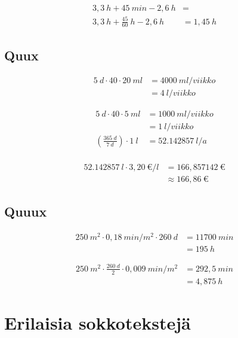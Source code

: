 \begin{align*}
3,3\ h + 45\ min - 2,6\ h &= \\
3,3\ h + \frac{45}{60}\ h - 2,6\ h &= 1,45\ h
\end{align*}


\chapter{Quux}



\begin{align*}
5\ d \cdot 40 \cdot 20\ ml &= 4000\ ml/viikko \\
                           &= 4\ l/viikko
\end{align*}




\begin{align*}
5\ d \cdot 40 \cdot 5\ ml &= 1000\ ml/viikko \\
                          &= 1\ l/viikko \\
\left ( \frac{365\ d}{7\ d} \right ) \cdot 1\ l &= 52.142857\ l/a \\
\end{align*}




\begin{align*}
52.142857\ l \cdot 3,20\ \text{€}/l &= 166,857142\ \text{€} \\
                                    &\approx 166,86\ \text{€}
\end{align*}


\chapter{Quuux}



\begin{align*}
250\ m^2 \cdot 0,18\ min/m^2 \cdot 260\ d &= 11700\ min \\
                                          &= 195\ h
\end{align*}




\begin{align*}
250\ m^2 \cdot \frac{260\ d}{2} \cdot 0,009\ min/m^2 &= 292,5\ min \\
                                                     &= 4,875\ h
\end{align*}


\part{Erilaisia sokkotekstejä}

